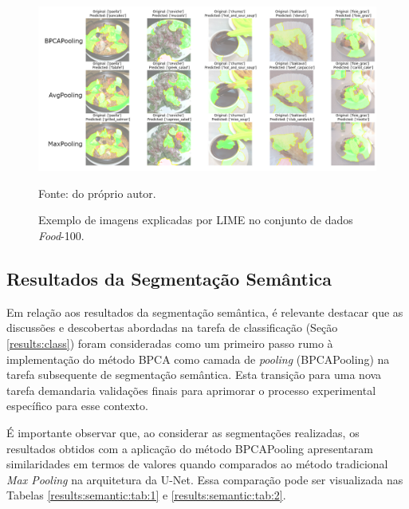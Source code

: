 \begin{figure}[H]
    \centering
    \caption{Exemplo de imagens explicadas por LIME no conjunto de dados \textit{Food}-100.}
    \label{results:fig:datasets:9}
    \includegraphics[width=1\textwidth]{recursos/imagens/results/lime_explanations_food.png}

    Fonte: do próprio autor.
\end{figure}


\subsection{Resultados da Segmentação Semântica}
\label{results:semantic}
Em relação aos resultados da segmentação semântica, é relevante destacar que as discussões e descobertas abordadas na tarefa de classificação (Seção \ref{results:class}) foram consideradas como um primeiro passo rumo à implementação do método BPCA como camada de \textit{pooling} (BPCAPooling) na tarefa subsequente de segmentação semântica. Esta transição para uma nova tarefa demandaria validações finais para aprimorar o processo experimental específico para esse contexto.

É importante observar que, ao considerar as segmentações realizadas, os resultados obtidos com a aplicação do método BPCAPooling apresentaram similaridades em termos de valores quando comparados ao método tradicional \textit{Max Pooling} na arquitetura da U-Net. Essa comparação pode ser visualizada nas Tabelas \ref{results:semantic:tab:1} e \ref{results:semantic:tab:2}.

